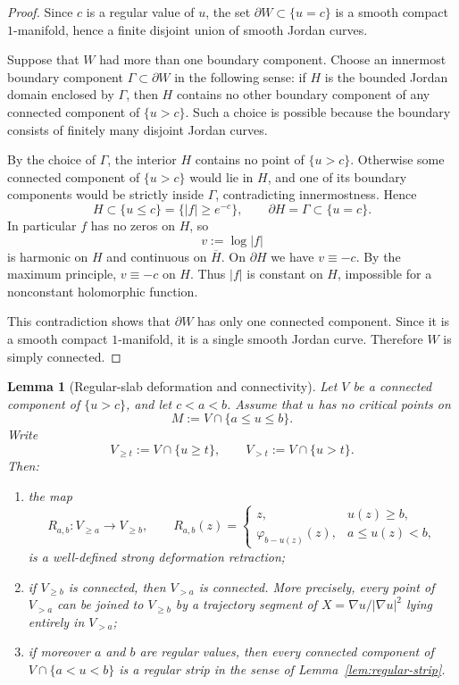 \documentclass[12pt]{amsart}
\theoremstyle{definition}
\newtheorem{lemma}[theorem]{Lemma}
\theoremstyle{remark}
\begin{document}
\begin{proof} Since $c$ is a regular value of $u$, the set $\partial W\subset\{u=c\}$ is a smooth compact $1$-manifold, hence
a finite disjoint union of smooth Jordan curves.

\indent Suppose that $W$ had more than one boundary component. Choose an innermost boundary
component $\Gamma\subset\partial W$ in the following sense: if $H$ is the bounded Jordan domain enclosed by $\Gamma$, then
$H$ contains no other boundary component of any connected component of $\{u>c\}$. Such a choice is
possible because the boundary consists of finitely many disjoint Jordan curves.

\indent By the choice of $\Gamma$, the interior $H$ contains no point of $\{u>c\}$. Otherwise some connected
component of $\{u>c\}$ would lie in $H$, and one of its boundary components would be strictly inside
$\Gamma$, contradicting innermostness. Hence
\[
H\subset\{u\le c\}=\{|f|\ge e^{-c}\},\qquad \partial H=\Gamma\subset\{u=c\}.
\]
In particular $f$ has no zeros on $H$, so
\[
 v:=\log|f|
\]
is harmonic on $H$ and continuous on $\overline H$. On $\partial H$ we have $v\equiv -c$. By the maximum principle,
$v\equiv -c$ on $H$. Thus $|f|$ is constant on $H$, impossible for a nonconstant holomorphic function.

\indent This contradiction shows that $\partial W$ has only one connected component. Since it is a smooth
compact $1$-manifold, it is a single smooth Jordan curve. Therefore $W$ is simply connected. \end{proof}

\medskip
\begin{lemma}[Regular-slab deformation and connectivity]\label{lem:regular-slab}
\emph{Let $V$ be a connected component of
$\{u>c\}$, and let $c<a<b$. Assume that $u$ has no critical points on
\[
 M:=V\cap\{a\le u\le b\}.
\]
Write
\[
V_{\ge t}:=V\cap\{u\ge t\},\qquad V_{>t}:=V\cap\{u>t\}.
\]
Then:}
\begin{enumerate}
\item[(a)] \emph{the map
\[
R_{a,b}:V_{\ge a}\to V_{\ge b},\qquad R_{a,b}(z)=\begin{cases}
z, & u(z)\ge b,\\
\varphi_{b-u(z)}(z), & a\le u(z)<b,
\end{cases}
\]
is a well-defined strong deformation retraction;}
\item[(b)] \emph{if $V_{\ge b}$ is connected, then $V_{>a}$ is connected. More precisely, every point of $V_{>a}$ can be joined to
$V_{\ge b}$ by a trajectory segment of $X=\nabla u/|\nabla u|^2$ lying entirely in $V_{>a}$;}
\item[(c)] \emph{if moreover $a$ and $b$ are regular values, then every connected component of $V\cap\{a<u<b\}$ is
 a regular strip in the sense of Lemma~\ref{lem:regular-strip}.}
\end{enumerate}
\end{lemma}
\end{document}

